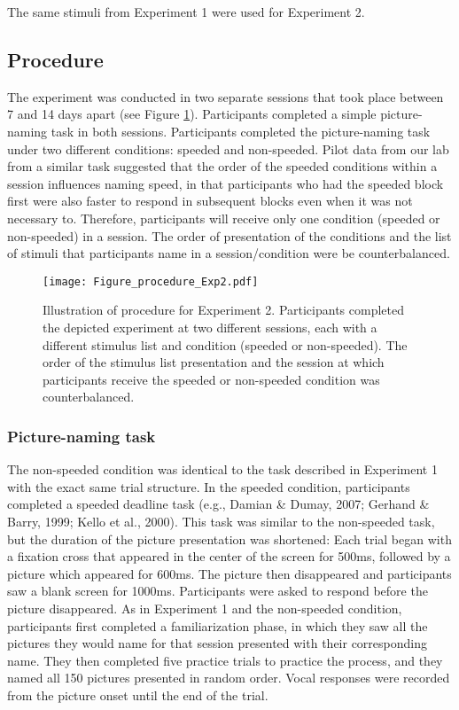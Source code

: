 \documentclass[
  man,floatsintext]{apa6}
\begin{document}
The same stimuli from Experiment 1 were used for Experiment 2.

\hypertarget{procedure-1}{%
\subsection{Procedure}\label{procedure-1}}

The experiment was conducted in two separate sessions that took place between 7 and 14 days apart (see Figure \ref{fig:Fig_proc_exp2}). Participants completed a simple picture-naming task in both sessions. Participants completed the picture-naming task under two different conditions: speeded and non-speeded. Pilot data from our lab from a similar task suggested that the order of the speeded conditions within a session influences naming speed, in that participants who had the speeded block first were also faster to respond in subsequent blocks even when it was not necessary to. Therefore, participants will receive only one condition (speeded or non-speeded) in a session. The order of presentation of the conditions and the list of stimuli that participants name in a session/condition were be counterbalanced.

\begin{figure}
  \centering
    \texttt{[image: Figure\_procedure\_Exp2.pdf]}
  \caption{Illustration of procedure for Experiment 2. Participants completed the depicted experiment at two different sessions, each with a different stimulus list and condition (speeded or non-speeded). The order of the stimulus list presentation and the session at which participants receive the speeded or non-speeded condition was counterbalanced.}
  \label{fig:Fig_proc_exp2}
\end{figure}

\hypertarget{picture-naming-task}{%
\subsubsection{Picture-naming task}\label{picture-naming-task}}

The non-speeded condition was identical to the task described in Experiment 1 with the exact same trial structure. In the speeded condition, participants completed a speeded deadline task (e.g., Damian \& Dumay, 2007; Gerhand \& Barry, 1999; Kello et al., 2000). This task was similar to the non-speeded task, but the duration of the picture presentation was shortened: Each trial began with a fixation cross that appeared in the center of the screen for 500ms, followed by a picture which appeared for 600ms. The picture then disappeared and participants saw a blank screen for 1000ms. Participants were asked to respond before the picture disappeared. As in Experiment 1 and the non-speeded condition, participants first completed a familiarization phase, in which they saw all the pictures they would name for that session presented with their corresponding name. They then completed five practice trials to practice the process, and they named all 150 pictures presented in random order. Vocal responses were recorded from the picture onset until the end of the trial.
\end{document}
